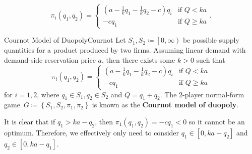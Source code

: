\documentclass[math]{amznotes}
\theoremstyle{remark}
\begin{document}
\begin{equation*}
    \pi_i\left(q_1, q_2\right) = \begin{cases}
        \left(a - \frac{1}{k}q_1 - \frac{1}{k}q_2 - c\right)q_i & \textrm{if } Q < ka \\
        -cq_1 & \textrm{if } Q \geq ka
    \end{cases}.
\end{equation*}
\begin{dfnbox}{Cournot Model of Duopoly}{Cournot}
    Let $S_1, S_2 \coloneqq \left[0, \infty\right)$ be possible supply quantities for a product produced by two firms. Assuming linear demand with demand-side reservation price $a$, then there exists some $k > 0$ such that
    \begin{equation*}
        \pi_i\left(q_1, q_2\right) = \begin{cases}
            \left(a - \frac{1}{k}q_1 - \frac{1}{k}q_2 - c\right)q_i & \textrm{if } Q < ka \\
            -cq_1 & \textrm{if } Q \geq ka
        \end{cases}
    \end{equation*}
    for $i = 1, 2$, where $q_1 \in S_1, q_2 \in S_2$ and $Q = q_1 + q_2$. The $2$-player normal-form game~$G \coloneqq \left\{S_1, S_2, \pi_1, \pi_2\right\}$ is known as the {\color{red} \textbf{Cournot model of duopoly}}. 
\end{dfnbox}
It is clear that if $q_1 > ka - q_2$, then $\pi_1\left(q_1, q_2\right) = -cq_1 < 0$ so it cannot be an optimum. Therefore, we effectively only need to consider $q_1 \in \left[0, ka - q_2\right]$ and $q_2 \in \left[0, ka - q_1\right]$.
\end{document}
